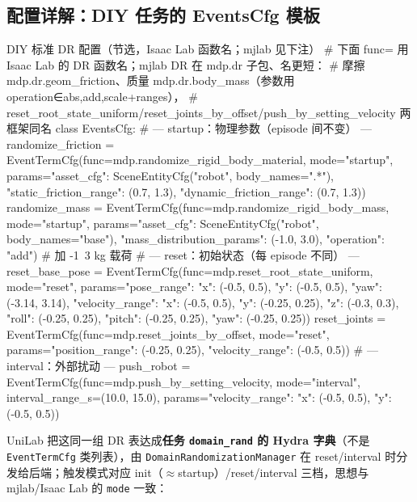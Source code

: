 \subsection{配置详解：DIY 任务的 EventsCfg 模板}
\label{sec:rlmc-diy-events-template}

\begin{codebox}[Python]{DIY 标准 DR 配置（节选，Isaac Lab 函数名；mjlab 见下注）}
# 下面 func= 用 Isaac Lab 的 DR 函数名；mjlab DR 在 mdp.dr 子包、名更短：
#   摩擦 mdp.dr.geom_friction、质量 mdp.dr.body_mass（参数用 operation∈{abs,add,scale}+ranges），
#   reset_root_state_uniform/reset_joints_by_offset/push_by_setting_velocity 两框架同名
class EventsCfg:
    # --- startup：物理参数（episode 间不变） ---
    randomize_friction = EventTermCfg(func=mdp.randomize_rigid_body_material,
        mode="startup", params={"asset_cfg": SceneEntityCfg("robot", body_names=".*"),
        "static_friction_range": (0.7, 1.3), "dynamic_friction_range": (0.7, 1.3)})
    randomize_mass = EventTermCfg(func=mdp.randomize_rigid_body_mass,
        mode="startup", params={"asset_cfg": SceneEntityCfg("robot", body_names="base"),
        "mass_distribution_params": (-1.0, 3.0), "operation": "add"})  # 加 -1~3 kg 载荷
    # --- reset：初始状态（每 episode 不同） ---
    reset_base_pose = EventTermCfg(func=mdp.reset_root_state_uniform, mode="reset",
        params={"pose_range": {"x": (-0.5, 0.5), "y": (-0.5, 0.5), "yaw": (-3.14, 3.14)},
                "velocity_range": {"x": (-0.5, 0.5), "y": (-0.25, 0.25), "z": (-0.3, 0.3),
                    "roll": (-0.25, 0.25), "pitch": (-0.25, 0.25), "yaw": (-0.25, 0.25)}})
    reset_joints = EventTermCfg(func=mdp.reset_joints_by_offset, mode="reset",
        params={"position_range": (-0.25, 0.25), "velocity_range": (-0.5, 0.5)})
    # --- interval：外部扰动 ---
    push_robot = EventTermCfg(func=mdp.push_by_setting_velocity, mode="interval",
        interval_range_s=(10.0, 15.0),
        params={"velocity_range": {"x": (-0.5, 0.5), "y": (-0.5, 0.5)}})
\end{codebox}

UniLab 把这同一组 DR 表达成\textbf{任务 \texttt{domain\_rand} 的 Hydra 字典}（不是 \verb|EventTermCfg| 类列表），由 \verb|DomainRandomizationManager| 在 reset/interval 时分发给后端；触发模式对应 init（$\approx$startup）/reset/interval 三档，思想与 mjlab/Isaac Lab 的 \verb|mode| 一致：

